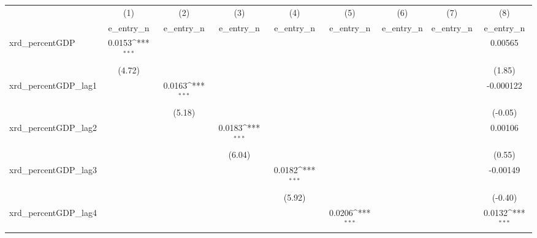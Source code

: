 {
\def\sym#1{\ifmmode^{#1}\else\(^{#1}\)\fi}
\begin{tabular}{l*{8}{c}}
\toprule
          &\multicolumn{1}{c}{(1)}&\multicolumn{1}{c}{(2)}&\multicolumn{1}{c}{(3)}&\multicolumn{1}{c}{(4)}&\multicolumn{1}{c}{(5)}&\multicolumn{1}{c}{(6)}&\multicolumn{1}{c}{(7)}&\multicolumn{1}{c}{(8)}\\
          &\multicolumn{1}{c}{e\_entry\_n}&\multicolumn{1}{c}{e\_entry\_n}&\multicolumn{1}{c}{e\_entry\_n}&\multicolumn{1}{c}{e\_entry\_n}&\multicolumn{1}{c}{e\_entry\_n}&\multicolumn{1}{c}{e\_entry\_n}&\multicolumn{1}{c}{e\_entry\_n}&\multicolumn{1}{c}{e\_entry\_n}\\
\midrule
xrd\_percentGDP&   0.0153\sym{***}&                  &                  &                  &                  &                  &                  &  0.00565         \\
          &   (4.72)         &                  &                  &                  &                  &                  &                  &   (1.85)         \\
\addlinespace
xrd\_percentGDP\_lag1&                  &   0.0163\sym{***}&                  &                  &                  &                  &                  &-0.000122         \\
          &                  &   (5.18)         &                  &                  &                  &                  &                  &  (-0.05)         \\
\addlinespace
xrd\_percentGDP\_lag2&                  &                  &   0.0183\sym{***}&                  &                  &                  &                  &  0.00106         \\
          &                  &                  &   (6.04)         &                  &                  &                  &                  &   (0.55)         \\
\addlinespace
xrd\_percentGDP\_lag3&                  &                  &                  &   0.0182\sym{***}&                  &                  &                  & -0.00149         \\
          &                  &                  &                  &   (5.92)         &                  &                  &                  &  (-0.40)         \\
\addlinespace
xrd\_percentGDP\_lag4&                  &                  &                  &                  &   0.0206\sym{***}&                  &                  &   0.0132\sym{***}\\

\end{tabular}}
